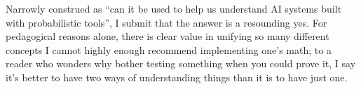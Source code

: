 Narrowly construed as ``can it be used to help us understand AI systems built with probabilistic tools'', I submit that the answer is a resounding yes. 
For pedagogical reasons alone, there is clear value in unifying so many different concepts 
%
I cannot highly enough recommend implementing one's math; to a reader who wonders why bother testing something when you could prove it, I say it's better to have two ways of understanding things than it is to have just one. 

%


